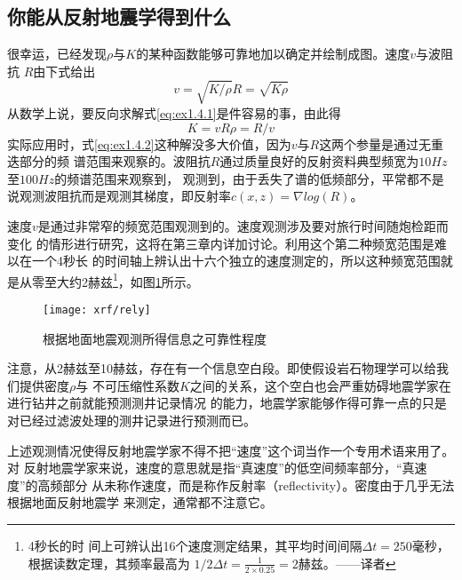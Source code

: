 \subsection{你能从反射地震学得到什么}
很幸运，已经发现$\rho$与$K$的某种函数能够可靠地加以确定并绘制成图。速度$v$与波阻抗
$R$由下式给出
\begin{subequations}\label{eq:ex1.4.1}
\begin{equation}
v=\sqrt{K/\rho} \label{eq:ex1.4.1a}
\end{equation}
\begin{equation}
R=\sqrt{K\rho} \label{eq:ex1.4.1b}
\end{equation}
\end{subequations}
从数学上说，要反向求解式\ref{eq:ex1.4.1}是件容易的事，由此得
\begin{subequations}\label{eq:ex1.4.2}
\begin{equation}
K=vR \label{eq:ex1.4.2a}
\end{equation}
\begin{equation}
\rho=R/v \label{eq:ex1.4.2b}
\end{equation}
\end{subequations}
实际应用时，式\ref{eq:ex1.4.2}这种解没多大价值，因为$v$与$R$这两个参量是通过无重迭部分的频
谱范围来观察的。波阻抗$R$通过质量良好的反射资料典型频宽为$10Hz$至$100Hz$的频谱范围来观察到，
观测到，由于丢失了谱的低频部分，平常都不是说观测波阻抗而是观测其梯度，即反射率$c(x,z)=\nabla log(R)$。

速度$v$是通过非常窄的频宽范围观测到的。速度观测涉及要对旅行时间随炮检距而变化
的情形进行研究，这将在第三章内详加讨论。利用这个第二种频宽范围是难以在一个4秒长
的时间轴上辨认出十六个独立的速度测定的，所以这种频宽范围就是从零至大约2赫兹\footnote{4秒长的时
间上可辨认出16个速度测定结果，其平均时间间隔$\Delta t=250$毫秒，根据读数定理，其频率最高为
$1/2\Delta t=\frac{1}{2\times 0.25}=2$赫兹。——译者}，如图\ref{fig:xrf/rely}所示。
\begin{figure}[H]
\centering
\texttt{[image: xrf/rely]}
\caption[rely]{根据地面地震观测所得信息之可靠性程度}
\label{fig:xrf/rely}
\end{figure}
注意，从2赫兹至10赫兹，存在有一个信息空白段。即使假设岩石物理学可以给我们提供密度$\rho$与
不可压缩性系数$K$之间的关系，这个空白也会严重妨碍地震学家在进行钻井之前就能预测测井记录情况
的能力，地震学家能够作得可靠一点的只是对已经过滤波处理的测井记录进行预测而已。

上述观测情况使得反射地震学家不得不把“速度”这个词当作一个专用术语来用了。对
反射地震学家来说，速度的意思就是指“真速度”的低空间频率部分，“真速度”的高频部分
从未称作速度，而是称作反射率（reflectivity）。密度由于几乎无法根据地面反射地震学
来测定，通常都不注意它。

